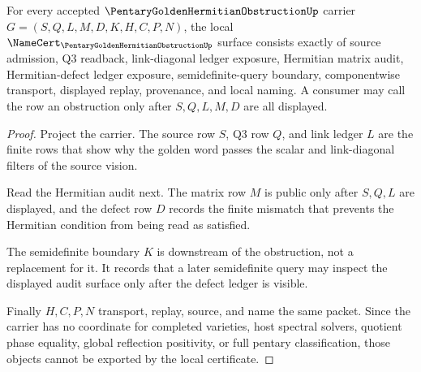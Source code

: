 \begin{theorem}
\label{thm:pentary-golden-hermitian-obstruction-namecert-obligations}
For every accepted $\PentaryGoldenHermitianObstructionUp$ carrier $G=(S,Q,L,M,D,K,H,C,P,N)$, the local $\NameCert_{\PentaryGoldenHermitianObstructionUp}$ surface consists exactly of source admission, Q3 readback, link-diagonal ledger exposure, Hermitian matrix audit, Hermitian-defect ledger exposure, semidefinite-query boundary, componentwise transport, displayed replay, provenance, and local naming. A consumer may call the row an obstruction only after $S,Q,L,M,D$ are all displayed.
\end{theorem}
\begin{proof}
Project the carrier. The source row $S$, Q3 row $Q$, and link ledger $L$ are the finite rows that show why the golden word passes the scalar and link-diagonal filters of the source vision.

Read the Hermitian audit next. The matrix row $M$ is public only after $S,Q,L$ are displayed, and the defect row $D$ records the finite mismatch that prevents the Hermitian condition from being read as satisfied.

The semidefinite boundary $K$ is downstream of the obstruction, not a replacement for it. It records that a later semidefinite query may inspect the displayed audit surface only after the defect ledger is visible.

Finally $H,C,P,N$ transport, replay, source, and name the same packet. Since the carrier has no coordinate for completed varieties, host spectral solvers, quotient phase equality, global reflection positivity, or full pentary classification, those objects cannot be exported by the local certificate.
\end{proof}

